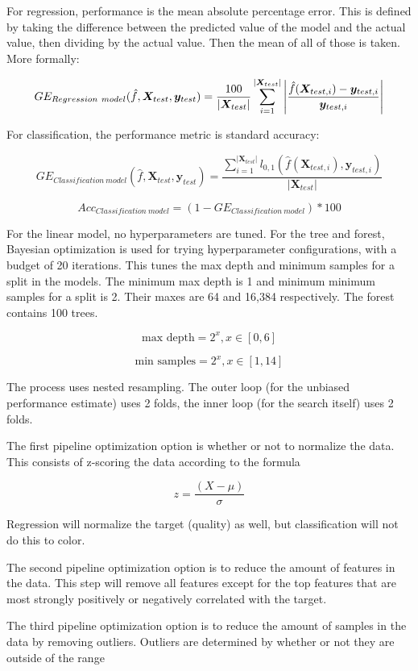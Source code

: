 \documentclass[12pt, letterpaper]{article}
\begin{document}
For regression, performance is the mean absolute percentage error. This is defined by taking the difference between the predicted value of the model and the actual value, then dividing by the actual value. Then the mean of all of those is taken. More formally:

$$
    GE_{Regression\ model}(\hat{f}, \bm{X}_{test}, \bm{y}_{test}) = \frac{100}{|\bm{X}_{test}|} \sum_{i=1}^{|\bm{X}_{test}|} \abs{\frac{\hat{f}(\bm{X}_{test,i}) - \bm{y}_{test,i}}{\bm{y}_{test,i}}}
$$

For classification, the performance metric is standard accuracy:

$$
    GE_{Classification\ model}(\hat{f}, \bm{X}_{test}, \bm{y}_{test}) = \frac{\sum_{i=1}^{|\bm{X}_{test}|}l_{0,1}(\hat{f}(\bm{X}_{test,i}), \bm{y}_{test,i})}{|\bm{X}_{test}|}
$$

$$
Acc_{Classification\ model} = (1 - GE_{Classification\ model}) * 100
$$

For the linear model, no hyperparameters are tuned. For the tree and forest, Bayesian optimization is used for trying hyperparameter configurations, with a budget of 20 iterations. This tunes the max depth and minimum samples for a split in the models. The minimum max depth is 1 and minimum minimum samples for a split is 2. Their maxes are 64 and 16,384 respectively. The forest contains 100 trees.

$$
\text{max depth} = 2^x, x \in [0,6]
$$

$$
\text{min samples} = 2^x, x \in [1,14]
$$

The process uses nested resampling. The outer loop (for the unbiased performance estimate) uses 2 folds, the inner loop (for the search itself) uses 2 folds.

The first pipeline optimization option is whether or not to normalize the data. This consists of z-scoring the data according to the formula

$$
z = \frac{(X - \mu)}{\sigma}
$$

Regression will normalize the target (quality) as well, but classification will not do this to color.

The second pipeline optimization option is to reduce the amount of features in the data. This step will remove all features except for the top features that are most strongly positively or negatively correlated with the target.

The third pipeline optimization option is to reduce the amount of samples in the data by removing outliers. Outliers are determined by whether or not they are outside of the range
\end{document}

